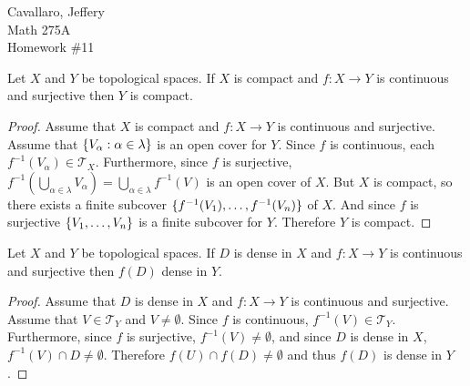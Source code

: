 \documentclass[letterpaper,12pt,fleqn]{article}
\newcommand{\T}{\mathscr{T}}
\renewcommand{\a}{\alpha}
\renewcommand{\l}{\lambda}
\begin{document}
Cavallaro, Jeffery \\
Math 275A \\
Homework \#11

\bigskip

\begin{theorem}[7.15]
  Let \(X\) and \(Y\) be topological spaces.  If \(X\) is compact and \(f:X\to Y\) is continuous and surjective then
  \(Y\) is compact.
\end{theorem}

\begin{proof}
  Assume that \(X\) is compact and \(f:X\to Y\) is continuous and surjective.  Assume that \(\set{V_{\a}:\a\in\l}\)
  is an open cover for \(Y\).  Since \(f\) is continuous, each \(f^{-1}(V_{\a})\in\T_X\).  Furthermore, since \(f\)
  is surjective, \(\displaystyle f^{-1}(\bigcup_{\a\in\l}V_{\a})=\bigcup_{\a\in\l}f^{-1}(V)\) is an open cover of \(X\).
  But \(X\) is compact, so there exists a finite subcover \(\{f^{-1}(V_1),\ldots,f^{-1}(V_n)\}\) of \(X\).  And
  since \(f\) is surjective \(\{V_1,\ldots,V_n\}\) is a finite subcover for \(Y\).  Therefore \(Y\) is compact.
\end{proof}

\begin{theorem}[7.18]
  Let \(X\) and \(Y\) be topological spaces.  If \(D\) is dense in \(X\) and \(f:X\to Y\) is continuous and surjective
  then \(f(D)\) dense in \(Y\).
\end{theorem}

\begin{proof}
  Assume that \(D\) is dense in \(X\) and \(f:X\to Y\) is continuous and surjective.  Assume that \(V\in\T_Y\) and
  \(V\ne\emptyset\).  Since \(f\) is continuous, \(f^{-1}(V)\in\T_Y\).  Furthermore, since \(f\) is surjective,
  \(f^{-1}(V)\ne\emptyset\), and since \(D\) is dense in \(X\), \(f^{-1}(V)\cap D\ne\emptyset\).  Therefore
  \(f(U)\cap f(D)\ne\emptyset\) and thus \(f(D)\) is dense in \(Y\).
\end{proof}
\end{document}
